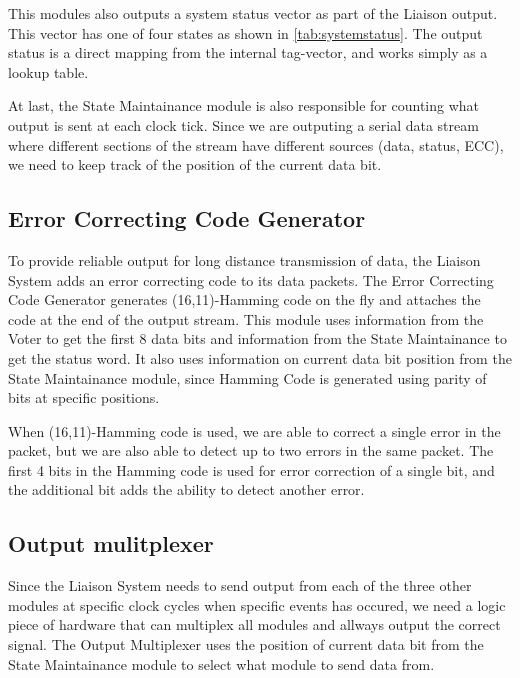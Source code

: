 This modules also outputs a system status vector as part of the Liaison output. This vector has one of four states as shown in \autoref{tab:systemstatus}.
The output status is a direct mapping from the internal tag-vector, and works simply as a lookup table.

At last, the State Maintainance module is also responsible for counting what output is sent at each clock tick. Since we are outputing a serial data stream
where different sections of the stream have different sources (data, status, ECC), we need to keep track of the position of the current data bit.

\subsection{Error Correcting Code Generator}
To provide reliable output for long distance transmission of data, the Liaison System adds an error correcting code to its data packets. The Error
Correcting Code Generator generates (16,11)-Hamming code on the fly and attaches the code at the end of the output stream. This module uses information
from the Voter to get the first 8 data bits and information from the State Maintainance to get the status word. It also uses information on current 
data bit position from the State Maintainance module, since Hamming Code is generated using parity of bits at specific positions\cite{ecc}.

When (16,11)-Hamming code is used, we are able to correct a single error in the packet, but we are also able to detect up to two errors in the same packet.
The first 4 bits in the Hamming code is used for error correction of a single bit, and the additional bit adds the ability to detect another error.

\subsection{Output mulitplexer}
Since the Liaison System needs to send output from each of the three other modules at specific clock cycles when specific events has occured, we need
a logic piece of hardware that can multiplex all modules and allways output the correct signal. The Output Multiplexer uses the position of current data bit
from the State Maintainance module to select what module to send data from.
